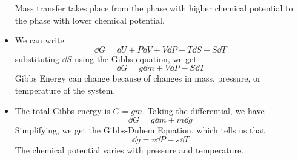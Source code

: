 \begin{itemize}
    \begin{idea}
        Mass transfer takes place from the phase with higher chemical potential to the phase with lower chemical potential.
    \end{idea}
    \item We can write 
    \begin{equation}
        \dd{G} = \dd{U} + P\dd{V} + V\dd{P} - T\dd{S} - S\dd{T}
    \end{equation}
    substituting $\dd{S}$ using the Gibbs equation, we get 
    \begin{equation}
        \dd{G} = g\dd{m} + V\dd{P} - S\dd{T}
    \end{equation}
    Gibbs Energy can change because of changes in mass, pressure, or temperature of the system.
    \item The total Gibbs energy is $G=gm$. Taking the differential, we have 
    \begin{equation}
        \dd{G}=g\dd{m}+m\dd{g}
    \end{equation}
    Simplifying, we get the Gibbs-Duhem Equation, which tells us that 
    \begin{equation}
        \dd{g} = v\dd{P} - s\dd{T}
    \end{equation}
    The chemical potential varies with pressure and temperature.
\end{itemize}